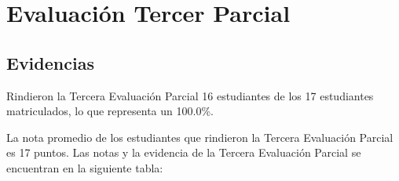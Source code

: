 \chapter{Evaluación Tercer Parcial}
\newpage

%



\pagestyle{empty} %

\section{Evidencias}
Rindieron la Tercera Evaluación Parcial 16 estudiantes de los 17 estudiantes matriculados, lo que representa un 100.0\%.

La nota promedio de los estudiantes que rindieron la Tercera Evaluación Parcial es 17 puntos. Las notas y la evidencia de la Tercera Evaluación Parcial se encuentran en la siguiente tabla:

